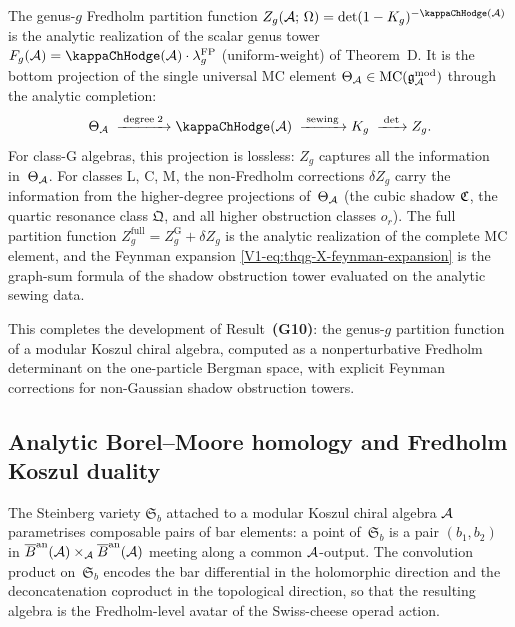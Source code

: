 \begin{remark}%
%
The genus-$g$ Fredholm partition function
$Z_g(\cA;\,\Omega) = \det(1 - \sewker_g)^{-\kappaChHodge(\cA)}$
is the analytic realization of the scalar genus tower
$F_g(\cA) = \kappaChHodge(\cA) \cdot \lambda_g^{\mathrm{FP}}$
\textup{(}uniform-weight\textup{)}
of Theorem~D. It is the bottom projection of the single
universal MC element
$\Theta_{\mathcal{A}} \in \mathrm{MC}(\mathfrak{g}_{\mathcal{A}}^{\mathrm{mod}})$
through the analytic completion:
\[
\Theta_\cA
\;\xrightarrow{\;\mathrm{degree}\;2\;}
\kappaChHodge(\cA)
\;\xrightarrow{\;\mathrm{sewing}\;}
\sewker_g
\;\xrightarrow{\;\det\;}
Z_g.
\]
For class-G algebras, this projection is lossless: $Z_g$
captures all the information in~$\Theta_{\mathcal{A}}$. For classes
L, C, M, the non-Fredholm corrections $\delta Z_g$ carry the
information from the higher-degree projections of~$\Theta_{\mathcal{A}}$
(the cubic shadow $\mathfrak{C}$, the quartic resonance class
$\mathfrak{Q}$, and all higher obstruction classes $o_r$).
The full partition function
$Z_g^{\mathrm{full}} = Z_g^{\mathrm{G}} + \delta Z_g$
is the analytic realization of the complete MC element, and
the Feynman expansion \eqref{V1-eq:thqg-X-feynman-expansion}
is the graph-sum formula of the shadow obstruction tower
evaluated on the analytic sewing data.

This completes the development of Result~\textbf{(G10)}: the
genus-$g$ partition function of a modular Koszul chiral algebra,
computed as a nonperturbative Fredholm determinant on the
one-particle Bergman space, with explicit Feynman corrections
for non-Gaussian shadow obstruction towers.
\end{remark}


\subsection{Analytic Borel--Moore homology and Fredholm Koszul duality}

\providecommand{\fSb}{\mathfrak{S}_b}

The Steinberg variety $\fSb$ attached to a modular Koszul chiral
algebra $\mathcal{A}$ parametrises composable pairs of bar elements:
a point of~$\fSb$ is a pair $(b_1, b_2)$ in
$\overline{B}^{\mathrm{an}}(\mathcal{A}) \times_{\mathcal{A}} \overline{B}^{\mathrm{an}}(\mathcal{A})$ meeting along a common
$\mathcal{A}$-output. The convolution product on~$\fSb$ encodes
the bar differential in the holomorphic direction and the
deconcatenation coproduct in the topological direction,
so that the resulting algebra is the Fredholm-level avatar
of the Swiss-cheese operad action.

